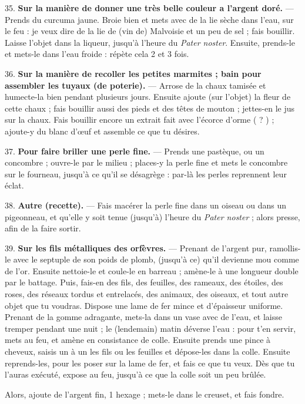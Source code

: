 \documentclass[a4paper, 11pt, oneside, polutonikogreek, french]{article}
\begin{document}
35. \textbf{Sur la manière de donner une très belle couleur a l'argent doré.} --- Prends du curcuma jaune. Broie bien et mets avec de la lie sèche dans l'eau, sur le feu : je veux dire de la lie de (vin de) Malvoisie et un peu de sel ; fais bouillir. Laisse l'objet dans la liqueur, jusqu'à l'heure du \emph{Pater noster}. Ensuite, prends-le et mets-le dans l'eau froide : répète cela 2 et 3 fois.

36. \textbf{Sur la manière de recoller les petites marmites ; bain pour assembler les tuyaux (de poterie).} --- Arrose de la chaux tamisée et humecte-la bien pendant plusieurs jours. Ensuite ajoute (sur l'objet) la fleur de cette chaux ; fais bouillir aussi des pieds et des têtes de mouton ; jettes-en le jus sur la chaux. Fais bouillir encore un extrait fait avec l'écorce d'orme ( ? ) ; ajoute-y du blanc d'œuf et assemble ce que tu désires.

37. \textbf{Pour faire briller une perle fine.} --- Prends une pastèque, ou un concombre ; ouvre-le par le milieu ; places-y la perle fine et mets le concombre sur le fourneau, jusqu'à ce qu'il se désagrège : par-là les perles reprennent leur éclat.

38. \textbf{Autre (recette).} --- Fais macérer la perle fine dans un oiseau ou dans un pigeonneau, et qu'elle y soit tenue (jusqu'à) l'heure du \emph{Pater noster} ; alors presse, afin de la faire sortir.

39. \textbf{Sur les fils métalliques des orfèvres.} --- Prenant de l'argent pur, ramollis-le avec le septuple de son poids de plomb, (jusqu'à ce) qu'il devienne mou comme de l'or. Ensuite nettoie-le et coule-le en barreau ; amène-le à une longueur double par le battage. Puis, fais-en des fils, des feuilles, des rameaux, des étoiles, des roses, des réseaux tordus et entrelacés, des animaux, des oiseaux, et tout autre objet que tu voudras. Dispose une lame de fer mince et d'épaisseur uniforme. Prenant de la gomme adragante, mets-la dans un vase avec de l'eau, et laisse tremper pendant une nuit ; le (lendemain) matin déverse l'eau : pour t'en servir, mets au feu, et amène en consistance de colle. Ensuite prends une pince à cheveux, saisis un à un les fils ou les feuilles et dépose-les dans la colle. Ensuite reprends-les, pour les poser sur la lame de fer, et fais ce que tu veux. Dès que tu l'auras exécuté, expose au feu, jusqu'à ce que la colle soit un peu brûlée.

Alors, ajoute de l'argent fin, 1 hexage ; mets-le dans le creuset, et fais fondre.
\end{document}
